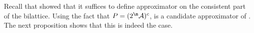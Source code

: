 Recall that \citet{DeneckerMT04} showed that it suffices to define approximator on the consistent part of the bilattice. 
Using the fact that $P=(2^\acts)^c$, \Ap is a candidate approximator of \Op. The next proposition shows that this is indeed the case. 


% 

